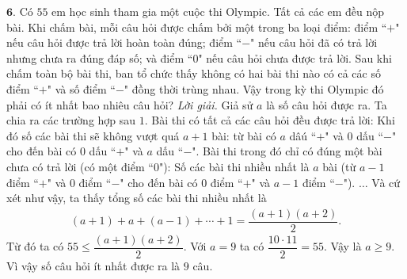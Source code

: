 \begin{multicols}{2}
	\vskip 0.1cm
	$\pmb{6.}$ Có $55$ em học sinh tham gia một cuộc thi Olympic. Tất cả các em đều nộp bài. Khi chấm bài, mỗi câu hỏi được chấm bởi một trong ba loại điểm: điểm ``$+$" nếu câu hỏi được trả lời hoàn toàn đúng; điểm ``$-$" nếu câu hỏi đã có trả lời nhưng chưa ra đúng đáp số; và điểm ``$0$" nếu câu hỏi chưa được trả lời. Sau khi chấm toàn bộ bài thi, ban tổ chức thấy không có hai bài thi nào có cả các số điểm ``$+$" và số điểm ``$-$" đồng thời trùng nhau. Vậy trong kỳ thi Olympic đó phải có ít nhất bao nhiêu câu hỏi?
	\vskip 0.1cm
	\textit{Lời giải.} 	Giả sử $a$ là số câu hỏi được ra.  Ta chia ra các trường hợp sau
	\vskip 0.1cm
	$1.$ Bài thi có tất cả các câu hỏi đều được trả lời: Khi đó số các bài thi sẽ không vượt quá $a+1$ bài: từ bài có $a$ dâú ``$+$" và $0$ dấu ``$-$" cho đến bài có $0$ dấu ``$+$" và $a$ dấu ``$-$".  
	\vskip 0.1cm
	Bài thi trong đó chỉ có đúng một bài chưa có trả lời (có một điểm ``$0$"): Số các bài thi  nhiều nhất là $a$ bài (từ $a-1$ điểm ``$+$" và $0$ điểm ``$-$" cho đến bài có $0$ điểm ``$+$" và $a-1$ điểm ``$-$"). $\ldots$
	\vskip 0.1cm
	Và cứ xét như vậy, ta thấy tổng số các bài thi nhiều nhất là 
	\begin{align*}
		(a\!+\!1)\!+\!a\!+\!(a\!-\!1)\!+\!\cdots\!+\!1=\dfrac{(a\!+\!1)(a\!+\!2)}{2}.
	\end{align*}
	Từ đó ta có $55\le\dfrac{(a+1)(a+2)}{2}$. Với $a=9$ ta có $\dfrac{10\cdot11}{2}=55$. Vậy là $a \ge 9$. 
	\vskip 0.1cm
	Vì vậy số câu hỏi ít nhất được ra là $9$ câu.
\end{multicols}
\newpage
\begingroup
\thispagestyle{toancuabinone}
